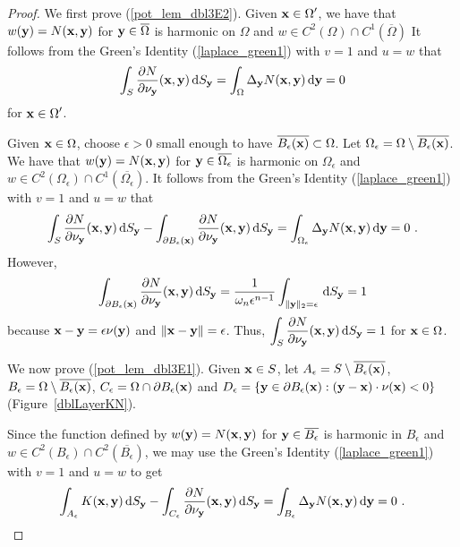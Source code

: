 \begin{proof}
 We first prove (\ref{pot_lem_dbl3E2}).
Given $\displaystyle \mathbf{x} \in \Omega^{\prime}$, we have that
$w(\mathbf{y}) = N(\mathbf{x},\mathbf{y})$ for $\mathbf{y} \in \overline{\Omega}$
is harmonic on $\Omega$ and
$\displaystyle w \in C^2(\Omega) \cap C^1(\overline{\Omega})$
It follows from the Green's Identity (\ref{laplace_green1}) with
$v = 1$ and $u= w$ that
\[
\int_S \frac{\partial{N}}{\partial \mathbf{\nu}_{\mathbf{y}}}(\mathbf{x},\mathbf{y}) \,\mathrm{d}{S}_{\mathbf{y}} =
\int_{\Omega} \Delta_{\mathbf{y}} N(\mathbf{x},\mathbf{y}) \,\mathrm{d}{\mathbf{y}} = 0
\]
for $\displaystyle \mathbf{x} \in \Omega^{\prime}$.

Given $\mathbf{x} \in \Omega$, choose $\epsilon >0$ small enough to have
$\overline{B_\epsilon(\mathbf{x})} \subset \Omega$.
Let $\displaystyle \Omega_\epsilon = \Omega \setminus
\overline{B_\epsilon(\mathbf{x})}$.  We have that
$w(\mathbf{y}) = N(\mathbf{x},\mathbf{y})$ for $\mathbf{y} \in \overline{\Omega_\epsilon}$
is harmonic on $\Omega_\epsilon$ and
$\displaystyle w \in C^2\left(\Omega_\epsilon\right) \cap
C^1\left(\overline{\Omega_\epsilon}\right)$.
It follows from the Green's Identity (\ref{laplace_green1}) with
$v = 1$ and $u = w$ that
\[
\int_S \frac{\partial{N}}{\partial \mathbf{\nu}_{\mathbf{y}}}(\mathbf{x},\mathbf{y}) \,\mathrm{d}{S}_{\mathbf{y}}
- \int_{\partial B_\epsilon(\mathbf{x})}
\frac{\partial{N}}{\partial \mathbf{\nu}_{\mathbf{y}}}(\mathbf{x},\mathbf{y}) \,\mathrm{d}{S}_{\mathbf{y}}
=
\int_{\Omega_\epsilon} \Delta_{\mathbf{y}} N(\mathbf{x},\mathbf{y}) \,\mathrm{d}{\mathbf{y}} = 0 \ .
\]
However,
\[
\int_{\partial B_\epsilon(\mathbf{x})}
\frac{\partial{N}}{\partial \mathbf{\nu}_{\mathbf{y}}}(\mathbf{x},\mathbf{y}) \,\mathrm{d}{S}_{\mathbf{y}}
= \frac{1}{\omega_n \epsilon^{n-1}}
\int_{\|\mathbf{y}\|_2=\epsilon} \,\mathrm{d}{S}_{\mathbf{y}} = 1
\]
because $\mathbf{x}-\mathbf{y} = \epsilon \mathbf{\nu}(\mathbf{y})$ and
$\|\mathbf{x}-\mathbf{y}\| = \epsilon$.  Thus,
$\displaystyle
\int_S \frac{\partial{N}}{\partial \mathbf{\nu}_{\mathbf{y}}}(\mathbf{x},\mathbf{y}) \,\mathrm{d}{S}_{\mathbf{y}} = 1$
for $\mathbf{x} \in \Omega$.

 We now prove (\ref{pot_lem_dbl3E1}).
Given $\mathbf{x} \in S$, let
$A_\epsilon = S \setminus \overline{B_\epsilon(\mathbf{x})}$,
$B_\epsilon = \Omega \setminus \overline{B_\epsilon(\mathbf{x})}$,
$C_\epsilon = \Omega \cap \partial B_\epsilon(\mathbf{x})$ and
$\displaystyle D_\epsilon = \left\{\mathbf{y} \in \partial B_\epsilon(\mathbf{x}) :
  (\mathbf{y}- \mathbf{x})\cdot \nu(\mathbf{x}) < 0 \right\}$
(Figure~\ref{dblLayerKN}).

Since the function defined by $w(\mathbf{y}) = N(\mathbf{x},\mathbf{y})$ for
$\mathbf{y} \in \overline{B_\epsilon}$ is
harmonic in $B_\epsilon$ and
$\displaystyle w \in C^2(B_\epsilon)\cap C^2\left(\overline{B_\epsilon}\right)$,
we may use the Green's Identity (\ref{laplace_green1}) with
$v = 1$ and $u = w$ to get
\[
\int_{A_\epsilon} K(\mathbf{x},\mathbf{y}) \,\mathrm{d}{S}_{\mathbf{y}}
-\int_{C_\epsilon} \frac{\partial{N}}{\partial \mathbf{\nu}_{\mathbf{y}}}(\mathbf{x},\mathbf{y}) \,\mathrm{d}{S}_{\mathbf{y}}
= \int_{B_\epsilon} \Delta_{\mathbf{y}} N(\mathbf{x},\mathbf{y}) \,\mathrm{d}{\mathbf{y}} = 0 \ .
\]


\end{proof}
